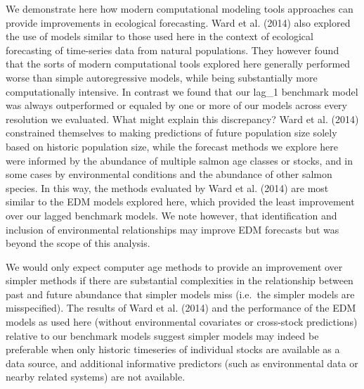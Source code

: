 \documentclass[
]{article}
\begin{document}
We demonstrate here how modern computational modeling tools approaches can provide improvements in ecological forecasting. Ward et al. (2014) also explored the use of models similar to those used here in the context of ecological forecasting of time-series data from natural populations. They however found that the sorts of modern computational tools explored here generally performed worse than simple autoregressive models, while being substantially more computationally intensive. In contrast we found that our lag\_1 benchmark model was always outperformed or equaled by one or more of our models across every resolution we evaluated. What might explain this discrepancy? Ward et al. (2014) constrained themselves to making predictions of future population size solely based on historic population size, while the forecast methods we explore here were informed by the abundance of multiple salmon age classes or stocks, and in some cases by environmental conditions and the abundance of other salmon species. In this way, the methods evaluated by Ward et al. (2014) are most similar to the EDM models explored here, which provided the least improvement over our lagged benchmark models. We note however, that identification and inclusion of environmental relationships may improve EDM forecasts but was beyond the scope of this analysis.

We would only expect computer age methods to provide an improvement over simpler methods if there are substantial complexities in the relationship between past and future abundance that simpler models miss (i.e.~the simpler models are misspecified). The results of Ward et al. (2014) and the performance of the EDM models as used here (without environmental covariates or cross-stock predictions) relative to our benchmark models suggest simpler models may indeed be preferable when only historic timeseries of individual stocks are available as a data source, and additional informative predictors (such as environmental data or nearby related systems) are not available.
\end{document}
